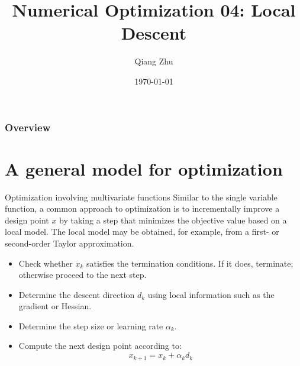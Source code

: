 \documentclass{beamer}
\title[Local Descent]{Numerical Optimization 04: Local Descent} %
\author{Qiang Zhu} %
\institute[University of Nevada Las Vegas] %
{
University of Nevada Las Vegas\\ %
\medskip
}
\date{\today} %
\begin{document}
\begin{frame}
\titlepage %
\end{frame}

\begin{frame}
\frametitle{Overview} %
\tableofcontents %
\end{frame}



\section{A general model for optimization}
\begin{frame}{Optimization involving multivariate functions}
Similar to the single variable function, a common approach to optimization is to incrementally improve a design point $x$ by taking a step that minimizes the objective value based on a local model. The local model may be obtained, for example, from a first- or second-order Taylor approximation.
\begin{itemize}
    \item Check whether $x_k$ satisfies the termination conditions. If it does, terminate; otherwise proceed to the next step.
    \item Determine the descent direction $d_k$ using local information such as the gradient or Hessian. 
    \item Determine the step size or learning rate $\alpha_k$.
    \item Compute the next design point according to:
    \begin{equation*}
        x_{k+1} = x_k + \alpha_k d_k
    \end{equation*}
\end{itemize}

\end{frame}
\end{document}
